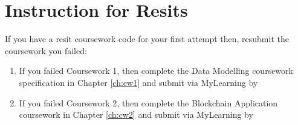 %
\section{Instruction for Resits}

If you have a resit coursework code for your first attempt then, resubmit the coursework you failed:
\begin{enumerate}
\item If you failed Coursework 1, then complete the Data Modelling coursework specification in Chapter \ref{ch:cw1} and submit via MyLearning by \resitdeadline
\item If you failed Coursework 2, then complete the Blockchain Application coursework in Chapter \ref{ch:cw2} and submit via MyLearning by \resitdeadline
\end{enumerate}
